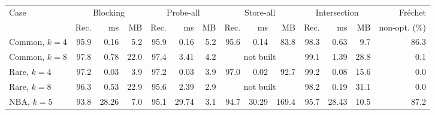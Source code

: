 \begin{tabular}{lrrrrrrrrrrrrr}
\toprule
Case & \multicolumn{3}{c}{Blocking} & \multicolumn{3}{c}{Probe-all} & \multicolumn{3}{c}{Store-all} & \multicolumn{3}{c}{Intersection} & Fr\'echet\\
\cmidrule(lr){2-4}\cmidrule(lr){5-7}\cmidrule(lr){8-10}\cmidrule(lr){11-13}
 & Rec. & ms & MB & Rec. & ms & MB & Rec. & ms & MB & Rec. & ms & MB & non-opt. (\%)\\
\midrule
Common, $k=4$ & 95.9 & 0.16 & 5.2 & 95.9 & 0.16 & 5.2 & 95.6 & 0.14 & 83.8 & 98.3 & 0.63 & 9.7 & 86.3\\
Common, $k=8$ & 97.8 & 0.78 & 22.0 & 97.4 & 3.41 & 4.2 & \multicolumn{3}{c}{not built} & 99.1 & 1.39 & 28.8 & 0.1\\
Rare, $k=4$ & 97.2 & 0.03 & 3.9 & 97.2 & 0.03 & 3.9 & 97.0 & 0.02 & 92.7 & 99.2 & 0.08 & 15.6 & 0.0\\
Rare, $k=8$ & 96.3 & 0.53 & 22.9 & 95.6 & 2.39 & 2.9 & \multicolumn{3}{c}{not built} & 98.2 & 0.19 & 31.1 & 0.0\\
NBA, $k=5$ & 93.8 & 28.26 & 7.0 & 95.1 & 29.74 & 3.1 & 94.7 & 30.29 & 169.4 & 95.7 & 28.43 & 10.5 & 87.2\\
\bottomrule
\end{tabular}
